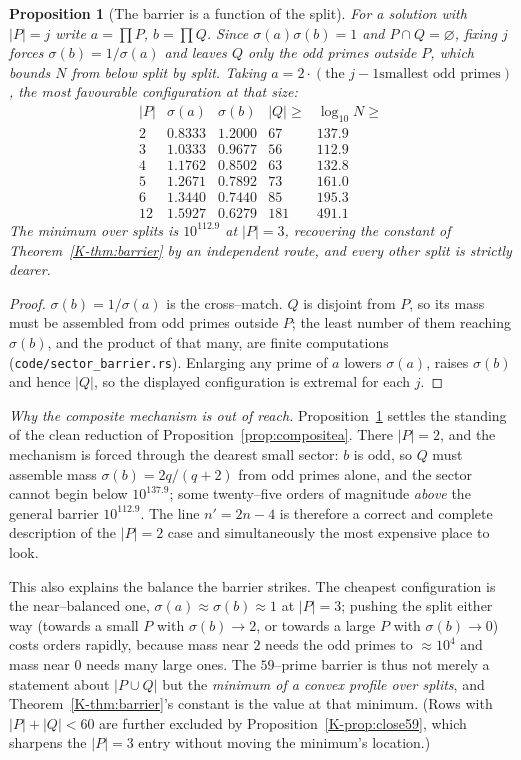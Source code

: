 \documentclass[11pt]{article}
\newtheorem{proposition}[theorem]{Proposition}
\theoremstyle{definition}
\begin{document}
\begin{proposition}[The barrier is a function of the split]\label{prop:sectorbarrier}
For a solution with $|P|=j$ write $a=\prod P$, $b=\prod Q$. Since $\sigma(a)\sigma(b)=1$ and
$P\cap Q=\varnothing$, fixing $j$ forces $\sigma(b)=1/\sigma(a)$ and leaves $Q$ only the odd primes
outside $P$, which bounds $N$ from below split by split. Taking $a=2\cdot(\text{the }j-1\text{
smallest odd primes})$, the most favourable configuration at that size:
\[
\begin{array}{r|cccc}
|P| & \sigma(a) & \sigma(b) & |Q|\ge & \log_{10}N\ge\\\hline
2 & 0.8333 & 1.2000 & 67 & 137.9\\
3 & 1.0333 & 0.9677 & 56 & 112.9\\
4 & 1.1762 & 0.8502 & 63 & 132.8\\
5 & 1.2671 & 0.7892 & 73 & 161.0\\
6 & 1.3440 & 0.7440 & 85 & 195.3\\
12 & 1.5927 & 0.6279 & 181 & 491.1
\end{array}
\]
The minimum over splits is $10^{112.9}$ at $|P|=3$, recovering the constant of
Theorem~\ref{K-thm:barrier} by an independent route, and every other split is strictly dearer.
\end{proposition}
\begin{proof}
$\sigma(b)=1/\sigma(a)$ is the cross--match. $Q$ is disjoint from $P$, so its mass must be assembled
from odd primes outside $P$; the least number of them reaching $\sigma(b)$, and the product of that
many, are finite computations (\texttt{code/sector\_barrier.rs}). Enlarging any prime of $a$ lowers
$\sigma(a)$, raises $\sigma(b)$ and hence $|Q|$, so the displayed configuration is extremal for each
$j$.
\end{proof}

\emph{Why the composite mechanism is out of reach.} Proposition~\ref{prop:sectorbarrier} settles the standing of the clean reduction of
Proposition~\ref{prop:compositea}. There $|P|=2$, and the mechanism is forced through the dearest
small sector: $b$ is odd, so $Q$ must assemble mass $\sigma(b)=2q/(q+2)$ from odd primes alone, and
the sector cannot begin below $10^{137.9}$; some twenty--five orders of magnitude \emph{above} the
general barrier $10^{112.9}$. The line $n'=2n-4$ is therefore a correct and complete description of
the $|P|=2$ case and simultaneously the most expensive place to look.

This also explains the balance the barrier strikes. The cheapest configuration is the near--balanced
one, $\sigma(a)\approx\sigma(b)\approx1$ at $|P|=3$; pushing the split either way (towards a small
$P$ with $\sigma(b)\to2$, or towards a large $P$ with $\sigma(b)\to0$) costs orders rapidly, because
mass near $2$ needs the odd primes to $\approx10^4$ and mass near $0$ needs many large ones. The
$59$--prime barrier is thus not merely a statement about $|P\cup Q|$ but the \emph{minimum of a
convex profile over splits}, and Theorem~\ref{K-thm:barrier}'s constant is the value at that minimum.
(Rows with $|P|+|Q|<60$ are further excluded by Proposition~\ref{K-prop:close59}, which sharpens the
$|P|=3$ entry without moving the minimum's location.)
\end{document}
